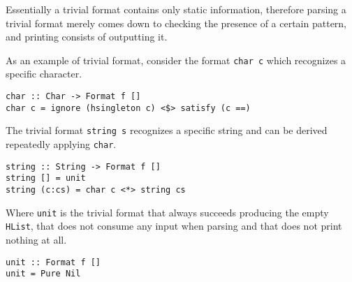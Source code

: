 \documentclass[../Thesis.tex]{subfiles}
\begin{document}
Essentially a trivial format contains only static information, therefore parsing a trivial format merely comes down to checking the presence of a certain pattern, and printing consists of outputting it.

As an example of trivial format, consider the format \texttt{char c} which recognizes a specific character.

\begin{verbatim}
char :: Char -> Format f []
char c = ignore (hsingleton c) <$> satisfy (c ==)
\end{verbatim}

The trivial format \texttt{string s} recognizes a specific string and can be derived repeatedly applying \texttt{char}.

\begin{verbatim}
string :: String -> Format f []
string [] = unit
string (c:cs) = char c <*> string cs
\end{verbatim}

Where \texttt{unit} is the trivial format that always succeeds producing
the empty \texttt{HList}, that does not consume any input when parsing and that does not print nothing at all.
\begin{verbatim}
unit :: Format f []
unit = Pure Nil
\end{verbatim}
\end{document}
